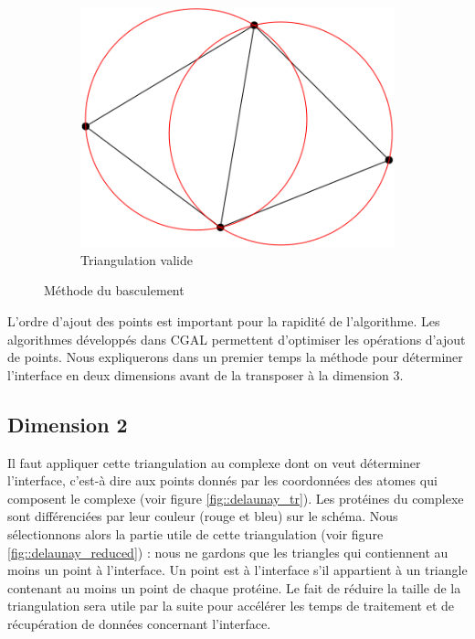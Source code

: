\begin{figure}[ht]
\begin{subfigure}{0.4\textwidth}
  \includegraphics[width=\textwidth]{figures/valid.png}
  \caption{Triangulation valide}
  \label{fig::valid}
\end{subfigure}
\caption{Méthode du basculement}
\label{fig::basculement}
\end{figure}
L'ordre d'ajout des points est important pour la rapidité de l'algorithme. Les algorithmes
développés dans CGAL permettent d'optimiser les opérations d'ajout de points.
 Nous expliquerons dans un premier
 temps la méthode pour déterminer l'interface en deux dimensions avant de la transposer à la
 dimension 3.

\subsection*{Dimension 2}

Il faut appliquer cette triangulation au complexe dont on veut déterminer l'interface, c'est-à dire
aux points donnés par les coordonnées des atomes qui composent le complexe
(voir figure \ref{fig::delaunay_tr}). Les protéines du complexe sont différenciées
par leur couleur (rouge et bleu) sur le schéma. Nous sélectionnons alors la partie utile de
cette triangulation (voir figure \ref{fig::delaunay_reduced}) : nous ne gardons que
les triangles qui contiennent au moins un point à l'interface.
Un point est à l'interface s'il appartient à un triangle contenant au moins un point
de chaque protéine. Le fait de réduire la taille de la triangulation sera utile par la suite
pour accélérer les temps de traitement et de récupération de données concernant l'interface.



